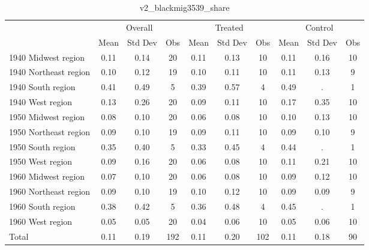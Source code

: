 \begin{table}[htbp]\centering
\def\sym#1{\ifmmode^{#1}\else\(^{#1}\)\fi}
\caption{v2\_blackmig3539\_share \label{tab1}}
\begin{tabular}{l*{3}{ccc}}
\toprule
                    &\multicolumn{3}{c}{Overall}           &\multicolumn{3}{c}{Treated}           &\multicolumn{3}{c}{Control}           \\
                    &        Mean&     Std Dev&         Obs&        Mean&     Std Dev&         Obs&        Mean&     Std Dev&         Obs\\
\midrule
1940 Midwest region &        0.11&        0.14&          20&        0.11&        0.13&          10&        0.11&        0.16&          10\\
1940 Northeast region&        0.10&        0.12&          19&        0.10&        0.11&          10&        0.11&        0.13&           9\\
1940 South region   &        0.41&        0.49&           5&        0.39&        0.57&           4&        0.49&           .&           1\\
1940 West region    &        0.13&        0.26&          20&        0.09&        0.11&          10&        0.17&        0.35&          10\\
1950 Midwest region &        0.08&        0.10&          20&        0.06&        0.08&          10&        0.10&        0.13&          10\\
1950 Northeast region&        0.09&        0.10&          19&        0.09&        0.11&          10&        0.09&        0.10&           9\\
1950 South region   &        0.35&        0.40&           5&        0.33&        0.45&           4&        0.44&           .&           1\\
1950 West region    &        0.09&        0.16&          20&        0.06&        0.08&          10&        0.11&        0.21&          10\\
1960 Midwest region &        0.07&        0.10&          20&        0.06&        0.08&          10&        0.09&        0.12&          10\\
1960 Northeast region&        0.09&        0.10&          19&        0.10&        0.12&          10&        0.09&        0.09&           9\\
1960 South region   &        0.38&        0.42&           5&        0.36&        0.48&           4&        0.45&           .&           1\\
1960 West region    &        0.05&        0.05&          20&        0.04&        0.06&          10&        0.05&        0.06&          10\\
Total               &        0.11&        0.19&         192&        0.11&        0.20&         102&        0.11&        0.18&          90\\
\bottomrule
\end{tabular}
\end{table}
